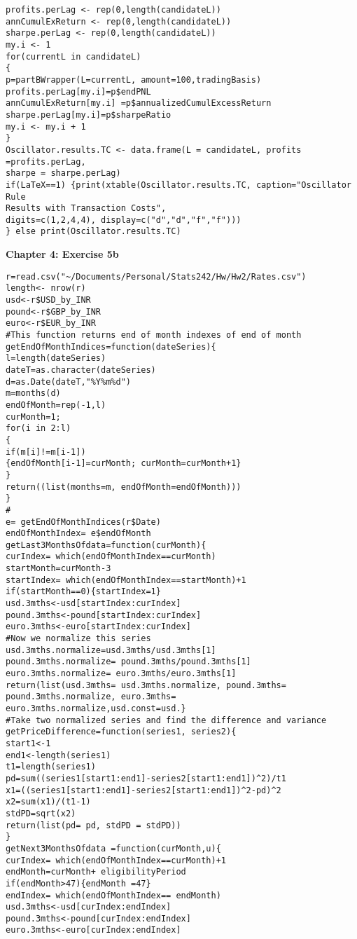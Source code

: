 \begin{small}
\begin{lstlisting}
profits.perLag <- rep(0,length(candidateL))
annCumulExReturn <- rep(0,length(candidateL))
sharpe.perLag <- rep(0,length(candidateL))
my.i <- 1
for(currentL in candidateL)
{
p=partBWrapper(L=currentL, amount=100,tradingBasis)
profits.perLag[my.i]=p$endPNL
annCumulExReturn[my.i] =p$annualizedCumulExcessReturn
sharpe.perLag[my.i]=p$sharpeRatio
my.i <- my.i + 1
}
Oscillator.results.TC <- data.frame(L = candidateL, profits =profits.perLag,
sharpe = sharpe.perLag)
if(LaTeX==1) {print(xtable(Oscillator.results.TC, caption="Oscillator Rule 
Results with Transaction Costs",
digits=c(1,2,4,4), display=c("d","d","f","f")))
} else print(Oscillator.results.TC)
\end{lstlisting}
\textbf{Chapter 4: Exercise 5b}
\begin{lstlisting}
r=read.csv("~/Documents/Personal/Stats242/Hw/Hw2/Rates.csv")
length<- nrow(r)
usd<-r$USD_by_INR
pound<-r$GBP_by_INR
euro<-r$EUR_by_INR
#This function returns end of month indexes of end of month
getEndOfMonthIndices=function(dateSeries){
l=length(dateSeries)
dateT=as.character(dateSeries)
d=as.Date(dateT,"%Y%m%d")
m=months(d)
endOfMonth=rep(-1,l)
curMonth=1;
for(i in 2:l)
{
if(m[i]!=m[i-1])
{endOfMonth[i-1]=curMonth; curMonth=curMonth+1}
}
return((list(months=m, endOfMonth=endOfMonth)))
}
#
e= getEndOfMonthIndices(r$Date)
endOfMonthIndex= e$endOfMonth
getLast3MonthsOfdata=function(curMonth){
curIndex= which(endOfMonthIndex==curMonth)
startMonth=curMonth-3
startIndex= which(endOfMonthIndex==startMonth)+1
if(startMonth==0){startIndex=1}
usd.3mths<-usd[startIndex:curIndex]
pound.3mths<-pound[startIndex:curIndex]
euro.3mths<-euro[startIndex:curIndex]
#Now we normalize this series
usd.3mths.normalize=usd.3mths/usd.3mths[1]
pound.3mths.normalize= pound.3mths/pound.3mths[1]
euro.3mths.normalize= euro.3mths/euro.3mths[1]
return(list(usd.3mths= usd.3mths.normalize, pound.3mths=
pound.3mths.normalize, euro.3mths= euro.3mths.normalize,usd.const=usd.}
#Take two normalized series and find the difference and variance
getPriceDifference=function(series1, series2){
start1<-1
end1<-length(series1)
t1=length(series1)
pd=sum((series1[start1:end1]-series2[start1:end1])^2)/t1
x1=((series1[start1:end1]-series2[start1:end1])^2-pd)^2
x2=sum(x1)/(t1-1)
stdPD=sqrt(x2)
return(list(pd= pd, stdPD = stdPD))
}
getNext3MonthsOfdata =function(curMonth,u){
curIndex= which(endOfMonthIndex==curMonth)+1
endMonth=curMonth+ eligibilityPeriod
if(endMonth>47){endMonth =47}
endIndex= which(endOfMonthIndex== endMonth)
usd.3mths<-usd[curIndex:endIndex]
pound.3mths<-pound[curIndex:endIndex]
euro.3mths<-euro[curIndex:endIndex]

\end{lstlisting}
\end{small}
